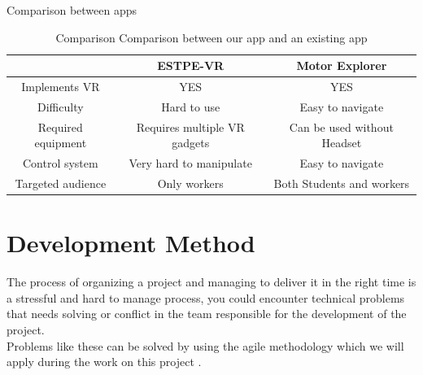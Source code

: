 \documentclass[]{report}
\begin{document}
{\Large{\color[HTML]{00D2CB} Comparison between  apps}}
\begin{table}[H]

	\begin{center}
	\begin{tabular}{|c|c|c|}
		\hline
		\rowcolor[HTML]{6600ff}
		{\color[HTML]{ffffff} }                   & {\color[HTML]{ffffff} ESTPE-VR}                     & {\color[HTML]{ffffff} Motor Explorer}              \\ \hline
		{\cellcolor[HTML]{6600ff}\color[HTML]{ffffff} Implements VR}      & {\color[HTML]{009901} YES}                          & {\color[HTML]{009901} YES}                         \\ \hline
		{\cellcolor[HTML]{6600ff}\color[HTML]{ffffff} Difficulty}         & {\color[HTML]{FE0000} Hard to use}                  & {\color[HTML]{009901} Easy to navigate}            \\ \hline
		{\cellcolor[HTML]{6600ff}\color[HTML]{ffffff} Required equipment} & {\color[HTML]{FE0000} Requires multiple VR gadgets} & {\color[HTML]{009901} Can be used without Headset} \\ \hline
		{\cellcolor[HTML]{6600ff}\color[HTML]{ffffff} Control system}     & {\color[HTML]{FE0000} Very hard to manipulate}      & {\color[HTML]{009901} Easy to navigate}            \\ \hline
		{\cellcolor[HTML]{6600ff}\color[HTML]{ffffff} Targeted audience}  & {\color[HTML]{FE0000} Only workers}                 & {\color[HTML]{009901} Both Students and workers}   \\ \hline
	\end{tabular}
\end{center}
	\caption[Comparison between our app and an existing app]{Comparison Comparison between our app and an existing app}
\end{table}

\section{Development Method}
The process of organizing a project and managing to deliver it in the right time
is a stressful and hard to manage process, you could encounter technical
problems that needs solving or conflict in the team responsible for the
development of the project. \\
Problems like these can be solved by using the agile methodology which we
will apply during the work on this project .
\end{document}
